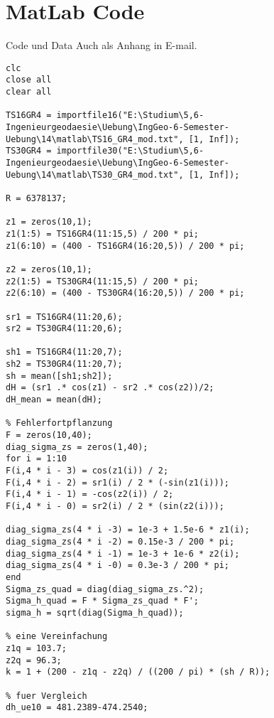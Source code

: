 \section{MatLab Code}
Code und Data Auch als Anhang in E-mail.
\begin{lstlisting}
clc
close all
clear all

TS16GR4 = importfile16("E:\Studium\5,6-Ingenieurgeodaesie\Uebung\IngGeo-6-Semester-Uebung\14\matlab\TS16_GR4_mod.txt", [1, Inf]);
TS30GR4 = importfile30("E:\Studium\5,6-Ingenieurgeodaesie\Uebung\IngGeo-6-Semester-Uebung\14\matlab\TS30_GR4_mod.txt", [1, Inf]);

R = 6378137;

z1 = zeros(10,1);
z1(1:5) = TS16GR4(11:15,5) / 200 * pi;
z1(6:10) = (400 - TS16GR4(16:20,5)) / 200 * pi;

z2 = zeros(10,1);
z2(1:5) = TS30GR4(11:15,5) / 200 * pi;
z2(6:10) = (400 - TS30GR4(16:20,5)) / 200 * pi;

sr1 = TS16GR4(11:20,6);
sr2 = TS30GR4(11:20,6);

sh1 = TS16GR4(11:20,7);
sh2 = TS30GR4(11:20,7);
sh = mean([sh1;sh2]);
dH = (sr1 .* cos(z1) - sr2 .* cos(z2))/2;
dH_mean = mean(dH);

% Fehlerfortpflanzung
F = zeros(10,40);
diag_sigma_zs = zeros(1,40);
for i = 1:10
F(i,4 * i - 3) = cos(z1(i)) / 2;
F(i,4 * i - 2) = sr1(i) / 2 * (-sin(z1(i)));
F(i,4 * i - 1) = -cos(z2(i)) / 2;
F(i,4 * i - 0) = sr2(i) / 2 * (sin(z2(i)));

diag_sigma_zs(4 * i -3) = 1e-3 + 1.5e-6 * z1(i);
diag_sigma_zs(4 * i -2) = 0.15e-3 / 200 * pi;
diag_sigma_zs(4 * i -1) = 1e-3 + 1e-6 * z2(i);
diag_sigma_zs(4 * i -0) = 0.3e-3 / 200 * pi;
end
Sigma_zs_quad = diag(diag_sigma_zs.^2);
Sigma_h_quad = F * Sigma_zs_quad * F';
sigma_h = sqrt(diag(Sigma_h_quad));

% eine Vereinfachung
z1q = 103.7;
z2q = 96.3;
k = 1 + (200 - z1q - z2q) / ((200 / pi) * (sh / R));

% fuer Vergleich
dh_ue10 = 481.2389-474.2540;
\end{lstlisting}


